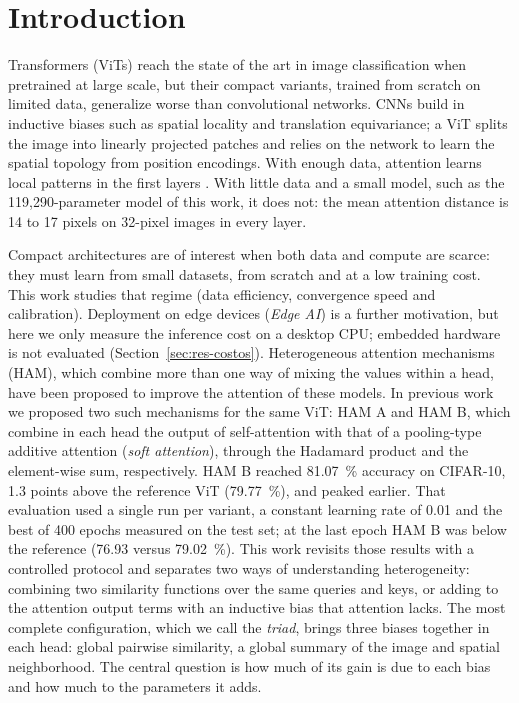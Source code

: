 \section{Introduction}
\label{sec:introduccion}
 Transformers (ViTs) \cite{dosovitskiy2021image} reach the state of the art in image classification when pretrained at large scale, but their compact variants, trained from scratch on limited data, generalize worse than convolutional networks. CNNs build in inductive biases such as spatial locality and translation equivariance; a ViT splits the image into linearly projected patches and relies on the network to learn the spatial topology from position encodings. With enough data, attention learns local patterns in the first layers \cite{raghu2021vision}. With little data and a small model, such as the 119,290-parameter model of this work, it does not: the mean attention distance is 14 to 17 pixels on 32-pixel images in every layer.

Compact architectures are of interest when both data and compute are scarce: they must learn from small datasets, from scratch and at a low training cost. This work studies that regime (data efficiency, convergence speed and calibration). Deployment on edge devices (\emph{Edge AI}) is a further motivation, but here we only measure the inference cost on a desktop CPU; embedded hardware is not evaluated (Section~\ref{sec:res-costos}). Heterogeneous attention mechanisms (HAM), which combine more than one way of mixing the values within a head, have been proposed to improve the attention of these models. In previous work \cite{martinez2025reconfiguration} we proposed two such mechanisms for the same ViT: HAM A and HAM B, which combine in each head the output of self-attention with that of a pooling-type additive attention (\emph{soft attention}), through the Hadamard product and the element-wise sum, respectively. HAM B reached 81.07~\% accuracy on CIFAR-10, 1.3 points above the reference ViT (79.77~\%), and peaked earlier. That evaluation used a single run per variant, a constant learning rate of 0.01 and the best of 400 epochs measured on the test set; at the last epoch HAM B was below the reference (76.93 versus 79.02~\%). This work revisits those results with a controlled protocol and separates two ways of understanding heterogeneity: combining two similarity functions over the same queries and keys, or adding to the attention output terms with an inductive bias that attention lacks. The most complete configuration, which we call the \emph{triad}, brings three biases together in each head: global pairwise similarity, a global summary of the image and spatial neighborhood. The central question is how much of its gain is due to each bias and how much to the parameters it adds.

